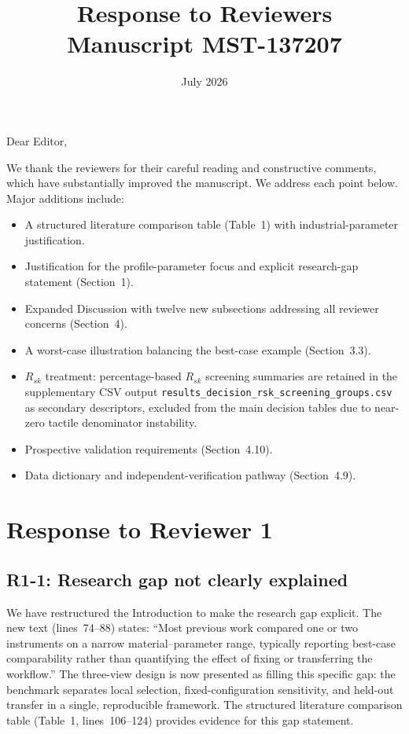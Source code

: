 \documentclass[10pt]{article}
\begin{document}
\title{Response to Reviewers \\ Manuscript MST-137207}
\author{}
\date{July 2026}
\maketitle

\noindent Dear Editor,

We thank the reviewers for their careful reading and constructive comments, which have substantially improved the manuscript. We address each point below. Major additions include:

\begin{itemize}
    \item A structured literature comparison table (Table~1) with industrial-parameter justification.
    \item Justification for the profile-parameter focus and explicit research-gap statement (Section~1).
    \item Expanded Discussion with twelve new subsections addressing all reviewer concerns (Section~4).
    \item A worst-case illustration balancing the best-case example (Section~3.3).
    \item $R_{sk}$ treatment: percentage-based $R_{sk}$ screening summaries are retained in the supplementary CSV output \texttt{results\_decision\_rsk\_screening\_groups.csv} as secondary descriptors, excluded from the main decision tables due to near-zero tactile denominator instability.
    \item Prospective validation requirements (Section~4.10).
    \item Data dictionary and independent-verification pathway (Section~4.9).
\end{itemize}

\section*{Response to Reviewer 1}

\subsection*{R1-1: Research gap not clearly explained}
We have restructured the Introduction to make the research gap explicit. The new text (lines~74--88) states: ``Most previous work compared one or two instruments on a narrow material--parameter range, typically reporting best-case comparability rather than quantifying the effect of fixing or transferring the workflow.'' The three-view design is now presented as filling this specific gap: the benchmark separates local selection, fixed-configuration sensitivity, and held-out transfer in a single, reproducible framework. The structured literature comparison table (Table~1, lines~106--124) provides evidence for this gap statement.
\end{document}
